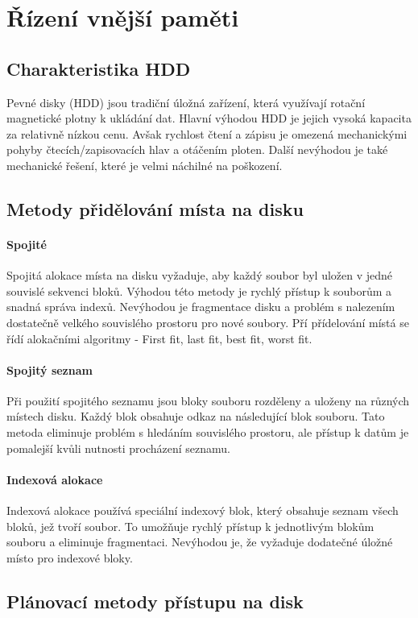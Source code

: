 \section{Řízení vnější paměti}
\subsection{Charakteristika HDD}
Pevné disky (HDD) jsou tradiční úložná zařízení, která využívají rotační magnetické plotny k ukládání dat. Hlavní výhodou HDD je jejich vysoká kapacita za relativně nízkou cenu. Avšak rychlost čtení a zápisu je omezená mechanickými pohyby čtecích/zapisovacích hlav a otáčením ploten. Další nevýhodou je také mechanické řešení, které je velmi náchilné na poškození.

\subsection{Metody přidělování místa na disku}
\paragraph{Spojité}
Spojitá alokace místa na disku vyžaduje, aby každý soubor byl uložen v jedné souvislé sekvenci bloků. Výhodou této metody je rychlý přístup k souborům a snadná správa indexů. Nevýhodou je fragmentace disku a problém s nalezením dostatečně velkého souvislého prostoru pro nové soubory. Pří přídelování místá se řídí alokačními algoritmy - First fit, last fit, best fit, worst fit.

\paragraph{Spojitý seznam}
Při použití spojitého seznamu jsou bloky souboru rozděleny a uloženy na různých místech disku. Každý blok obsahuje odkaz na následující blok souboru. Tato metoda eliminuje problém s hledáním souvislého prostoru, ale přístup k datům je pomalejší kvůli nutnosti procházení seznamu.

\paragraph{Indexová alokace}
Indexová alokace používá speciální indexový blok, který obsahuje seznam všech bloků, jež tvoří soubor. To umožňuje rychlý přístup k jednotlivým blokům souboru a eliminuje fragmentaci. Nevýhodou je, že vyžaduje dodatečné úložné místo pro indexové bloky.

\subsection{Plánovací metody přístupu na disk}
